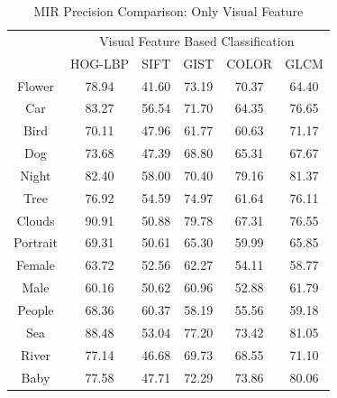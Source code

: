 \begin{table}
\centering
\caption{ MIR Precision Comparison: Only Visual Feature} %
\vspace*{0.2 cm}
\begin{tabular}{| c | c | c | c | c | c |}
\hline
 {\multirow{2}{*}{Labels}} & \multicolumn{5}{|c|}{Visual Feature Based Classification} \\ 
 \cline{2-6}
 & HOG-LBP & SIFT & GIST & COLOR & GLCM \\  [1ex] \hline
Flower &  78.94 & 41.60 & 73.19 & 70.37 & 64.40 \\  [1ex] \hline
Car & 83.27 & 56.54 & 71.70 & 64.35 & 76.65 \\  [1ex] \hline
Bird &  70.11 & 47.96 & 61.77 & 60.63 & 71.17 \\  [1ex] \hline
Dog &  73.68 & 47.39 & 68.80 & 65.31 & 67.67 \\  [1ex] \hline
Night &  82.40 & 58.00 & 70.40 & 79.16 & 81.37 \\  [1ex] \hline
Tree &  76.92 & 54.59 & 74.97 & 61.64 & 76.11 \\  [1ex] \hline
Clouds &  90.91 & 50.88 & 79.78 & 67.31 & 76.55 \\  [1ex] \hline
Portrait &  69.31 & 50.61 & 65.30 & 59.99 & 65.85 \\  [1ex] \hline
Female & 63.72 & 52.56 & 62.27 & 54.11 & 58.77 \\  [1ex] \hline
Male &  60.16 & 50.62 & 60.96 & 52.88 & 61.79 \\  [1ex] \hline
People &  68.36 & 60.37 & 58.19 & 55.56 & 59.18 \\  [1ex] \hline
Sea & 88.48 & 53.04 & 77.20 & 73.42 & 81.05 \\  [1ex] \hline
River & 77.14 & 46.68 & 69.73 & 68.55 & 71.10 \\  [1ex] \hline
Baby & 77.58 & 47.71 & 72.29 & 73.86 & 80.06 \\  [1ex]  \hline
\end{tabular}
\label{MIRPrecisionVisual} %
\end{table}
